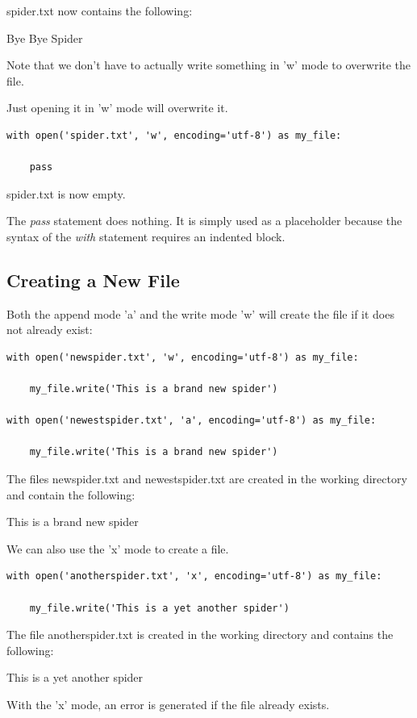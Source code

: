 \documentclass{article}
\begin{document}
spider.txt now contains the following:

Bye Bye Spider

Note that we don’t have to actually write something in 'w'  mode to overwrite the file.

Just opening it in 'w'  mode will overwrite it.

\begin{lstlisting}
with open('spider.txt', 'w', encoding='utf-8') as my_file:

    pass
\end{lstlisting}

spider.txt  is now empty.

The \textit{pass} statement does nothing.  It is simply used as a placeholder because the syntax of the \textit{with} statement requires an indented block. 

\subsection{Creating a New File}

Both the append mode 'a' and the write mode 'w' will create the file if it does not already exist:

\begin{lstlisting}
with open('newspider.txt', 'w', encoding='utf-8') as my_file:

    my_file.write('This is a brand new spider')

with open('newestspider.txt', 'a', encoding='utf-8') as my_file:

    my_file.write('This is a brand new spider')
\end{lstlisting}

The files newspider.txt and newestspider.txt are created in the working directory and  contain the following:

This is a brand new spider

We can also use the 'x' mode to create a file.

\begin{lstlisting}
with open('anotherspider.txt', 'x', encoding='utf-8') as my_file:

    my_file.write('This is a yet another spider')
\end{lstlisting}

The file anotherspider.txt is created in the working directory and  contains the following:

This is a yet another spider

With the 'x' mode, an error is generated  if the file already exists.
\end{document}
